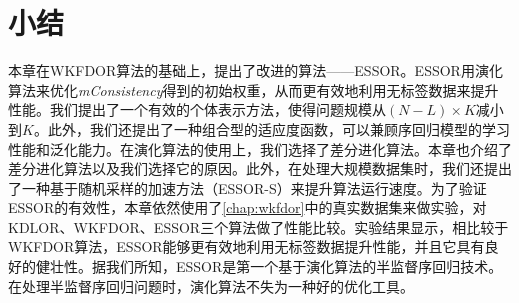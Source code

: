 \section{小结}

本章在WKFDOR算法的基础上，提出了改进的算法——ESSOR。ESSOR用演化算法来优化\textit{mConsistency}得到的初始权重，从而更有效地利用无标签数据来提升性能。我们提出了一个有效的个体表示方法，使得问题规模从\((N-L) \times K\)减小到\(K\)。此外，我们还提出了一种组合型的适应度函数，可以兼顾序回归模型的学习性能和泛化能力。在演化算法的使用上，我们选择了差分进化算法。本章也介绍了差分进化算法以及我们选择它的原因。此外，在处理大规模数据集时，我们还提出了一种基于随机采样的加速方法（ESSOR-S）来提升算法运行速度。为了验证ESSOR的有效性，本章依然使用了\autoref{chap:wkfdor}中的真实数据集来做实验，对KDLOR、WKFDOR、ESSOR三个算法做了性能比较。实验结果显示，相比较于WKFDOR算法，ESSOR能够更有效地利用无标签数据提升性能，并且它具有良好的健壮性。据我们所知，ESSOR是第一个基于演化算法的半监督序回归技术。在处理半监督序回归问题时，演化算法不失为一种好的优化工具。

